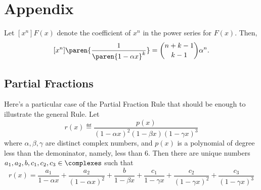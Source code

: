 \documentclass[handout]{mcs}
\begin{document}




\examspace
\section*{Appendix}
Let $[x^n]F(x)$ denote the coefficient of $x^n$ in the power series
for $F(x)$.  Then,
\[
[x^n]\paren{\frac{1}{\paren{1-\alpha x}^k}} = \binom{n+k-1}{k-1}\alpha^n.
\]

\subsection*{Partial Fractions}

Here's a particular case of the Partial Fraction Rule that should be
enough to illustrate the general Rule.  Let
\[
r(x) \eqdef \frac{p(x)}{(1-\alpha x)^2 (1-\beta x) (1-\gamma x)^3}
\]
where $\alpha, \beta, \gamma$ are distinct complex numbers, and $p(x)$ is
a polynomial of degree less than the demoninator, namely, less than 6.
Then there are unique numbers $a_1,a_2,b,c_1,c_2,c_3 \in \complexes$ such
that
\[
r(x)
= \frac{a_1}{1-\alpha x} + \frac{a_2}{(1-\alpha x)^2}
+ \frac{b}{1-\beta x}
+ \frac{c_1}{1-\gamma x} + \frac{c_2}{(1-\gamma x)^2} + \frac{c_3}{(1-\gamma x)^3}
\]

\iffalse Explain why partial fractions together with~\eqref{1axk} imply
that there is a closed form expression (allowing binomial coefficients)
for $[x^n]\paren{R(x)/S(x)}$ for arbitrary polynomials $R(x),S(x)$.
\fi


\end{document}
